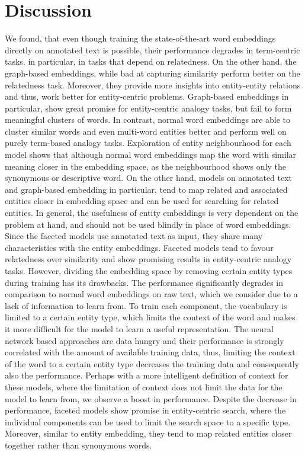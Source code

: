 \section{Discussion}
We found, that even though training the state-of-the-art word embeddings directly on annotated text is possible, their performance degrades in term-centric tasks, in particular, in tasks that depend on relatedness. On the other hand, the graph-based embeddings, while bad at capturing similarity perform better on the relatedness task. Moreover, they provide more insights into entity-entity relations and thus, work better for entity-centric problems. Graph-based embeddings in particular, show great promise for entity-centric analogy tasks, but fail to form meaningful clusters of words. In contrast, normal word embeddings are able to cluster similar words and even multi-word entities better and perform well on purely term-based analogy tasks. Exploration of entity neighbourhood for each model shows that although normal word embeddings map the word with similar meaning closer in the embedding space, as the neighbourhood shows only the synonymous or descriptive word. On the other hand, models on annotated text and graph-based embedding in particular, tend to map related and associated entities closer in embedding space and can be used for searching for related entities. In general, the usefulness of entity embeddings is very dependent on the problem at hand, and should not be used blindly in place of word embeddings.
\\
Since the faceted models use annotated text as input, they share many characteristics with the entity embeddings. Faceted models tend to favour relatedness over similarity and show promising results in entity-centric analogy tasks. However, dividing the embedding space by removing certain entity types during training has its drawbacks. The performance significantly degrades in comparison to normal word embeddings on raw text, which we consider due to a lack of information to learn from. To train each component, the vocabulary is limited to a certain entity type, which limits the context of the word and makes it more difficult for the model to learn a useful representation. The neural network based approaches are data hungry and their performance is strongly correlated with the amount of available training data, thus, limiting the context of the word to a certain entity type decreases the training data and consequently also the performance. Perhaps with a more intelligent definition of context for these models, where the limitation of context does not limit the data for the model to learn from, we observe a boost in performance. Despite the decrease in performance, faceted models show promise in entity-centric search, where the individual components can be used to limit the search space to a specific type. Moreover, similar to entity embedding, they tend to map related entities closer together rather than synonymous words. 
